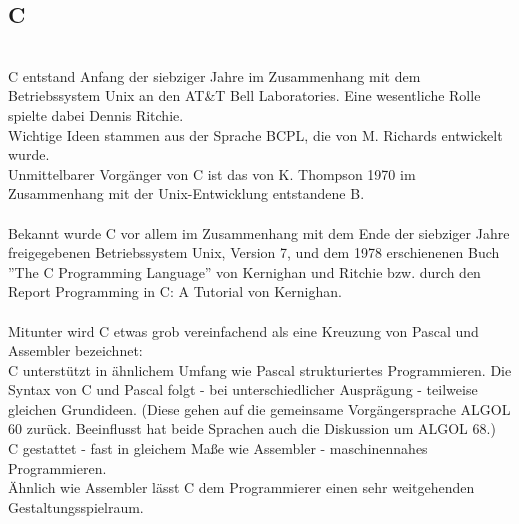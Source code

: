 \subsection{C}\ \\
C entstand Anfang der siebziger Jahre im Zusammenhang mit dem Betriebssystem Unix an den AT\&T Bell Laboratories. Eine wesentliche Rolle spielte dabei Dennis Ritchie.\\
Wichtige Ideen stammen aus der Sprache BCPL, die von M. Richards entwickelt wurde.\\
Unmittelbarer Vorgänger von C ist das von K. Thompson 1970 im Zusammenhang mit der Unix-Entwicklung entstandene B.\\
\\
Bekannt wurde C vor allem im Zusammenhang mit dem Ende der siebziger Jahre freigegebenen Betriebssystem Unix, Version 7, und dem 1978 erschienenen Buch ''The C Programming Language'' von Kernighan und Ritchie bzw. durch den Report Programming in C: A Tutorial von Kernighan.\\
\\
Mitunter wird C etwas grob vereinfachend als eine Kreuzung von Pascal und Assembler bezeichnet:\\

C unterstützt in ähnlichem Umfang wie Pascal strukturiertes Programmieren.
Die Syntax von C und Pascal folgt - bei unterschiedlicher Ausprägung - teilweise gleichen Grundideen. (Diese gehen auf die gemeinsame Vorgängersprache ALGOL 60 zurück. Beeinflusst hat beide Sprachen auch die Diskussion um ALGOL 68.)\\
C gestattet - fast in gleichem Maße wie Assembler - maschinennahes Programmieren.\\
Ähnlich wie Assembler lässt C dem Programmierer einen sehr weitgehenden Gestaltungsspielraum. \\

